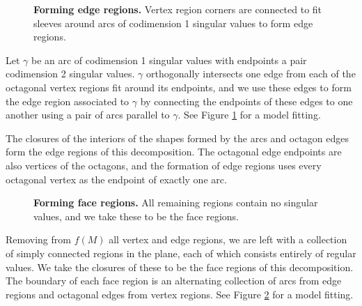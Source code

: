 \begin{figure}[h!]
	\label{fig:edge-sleeve}
	\caption{
		\textbf{Forming edge regions.}
		Vertex region corners are connected to fit sleeves around arcs of codimension 1 singular values to form edge regions.
	}
\end{figure}

Let $\gamma$ be an arc of codimension 1 singular values with endpoints a pair codimension 2 singular values.
$\gamma$ orthogonally intersects one edge from each of the octagonal vertex regions fit around its endpoints, and we use these edges to form the edge region associated to $\gamma$ by connecting the endpoints of these edges to one another using a pair of arcs parallel to $\gamma$.
See Figure \ref{fig:edge-sleeve} for a model fitting.

The closures of the interiors of the shapes formed by the arcs and octagon edges form the edge regions of this decomposition.
The octagonal edge endpoints are also vertices of the octagons, and the formation of edge regions uses every octagonal vertex as the endpoint of exactly one arc.

\begin{figure}[h!]
	\label{fig:face-sleeve}
	\caption{
		\textbf{Forming face regions.}
		All remaining regions contain no singular values, and we take these to be the face regions.
	}
\end{figure}

Removing from $f(M)$ all vertex and edge regions, we are left with a collection of simply connected regions in the plane, each of which consists entirely of regular values.
We take the closures of these to be the face regions of this decomposition.
The boundary of each face region is an alternating collection of arcs from edge regions and octagonal edges from vertex regions.
See Figure \ref{fig:face-sleeve} for a model fitting.
%
%
%
%


